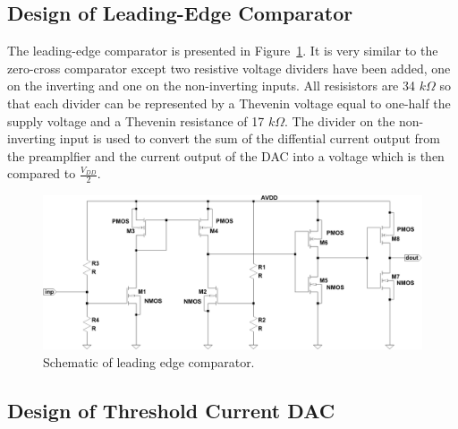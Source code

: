 \documentclass[12pt, onecolumn]{IEEEtran}
\begin{document}
\subsection*{Design of Leading-Edge Comparator}

The leading-edge comparator is presented in Figure~\ref{FIG:LE_CMP}. It is very similar to the zero-cross comparator except two resistive voltage dividers have been added, one on the inverting and one on the non-inverting inputs.  All resisistors are 34 $k \Omega$ so that each divider can be represented by a Thevenin voltage equal to one-half the supply voltage and a Thevenin resistance of 17 $k \Omega$.  The divider on the non-inverting input is used to convert the sum of the diffential current output from the preamplfier and the current output of the DAC into a voltage which is then compared to $\frac{V_{DD}}{2}$.

\begin{figure}[htbp!]
	\centering
 	\includegraphics[scale=0.65,keepaspectratio=true]{./images/le_cmp.pdf}
 	\caption{Schematic of leading edge comparator.}
 	\label{FIG:LE_CMP}
\end{figure}


\subsection*{Design of Threshold Current DAC}
\end{document}

